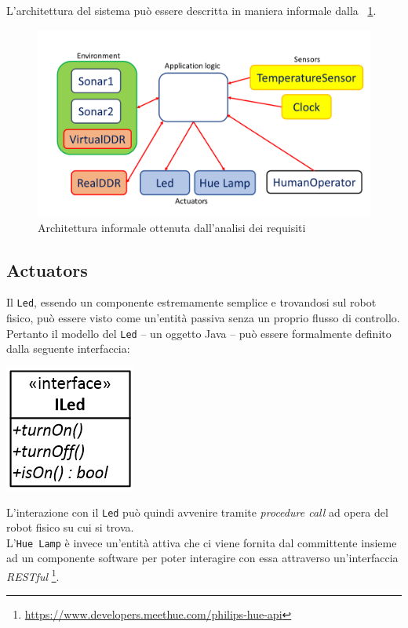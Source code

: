 \documentclass{../llncs}
\newcommand{\labelfig}[1]{\label{fig:#1}}
\newcommand{\xf}[1]{\figurename~\ref{fig:#1}}
\begin{document}
L'architettura del sistema può essere descritta in maniera informale dalla \xf{informalRA}.
\begin{figure}[!htb]
\centering
\includegraphics[scale=0.4]{img/informalReqAnalysis.png}
\caption{Architettura informale ottenuta dall'analisi dei requisiti}\labelfig{informalRA}
\end{figure}

\subsection{Actuators}
Il \texttt{Led}, essendo un componente estremamente semplice e trovandosi sul robot fisico, può essere visto come un'entità passiva senza un proprio flusso di controllo. Pertanto il modello del \texttt{Led} -- un oggetto Java -- può essere formalmente definito dalla seguente interfaccia:

\begin{center}
\includegraphics[scale=0.4]{img/iled.png}
\end{center}

L'interazione con il \texttt{Led} può quindi avvenire tramite \textit{procedure call} ad opera del robot fisico su cui si trova.\\

L'\texttt{Hue Lamp} è invece un'entità attiva che ci viene fornita dal committente insieme ad un componente software per poter interagire con essa attraverso un'interfaccia \textit{RESTful}
\footnote{\url{https://www.developers.meethue.com/philips-hue-api}}.
\end{document}
